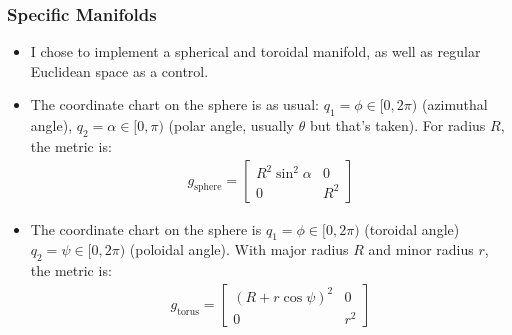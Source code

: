 \documentclass{beamer}
\begin{document}
\begin{frame}
    \frametitle{Specific Manifolds}

    \begin{itemize}
        \item I chose to implement a spherical and toroidal manifold,
        as well as regular Euclidean space as a control.
        \item The coordinate chart on the sphere is as usual: 
        $q_1 = \phi \in [0, 2\pi)$ (azimuthal angle),
        $q_2 = \alpha \in [0, \pi)$ (polar angle, usually $\theta$ but that's taken).
        For radius $R$, the metric is:
        \begin{align*}
            g_\text{sphere} = \begin{bmatrix}
                R^2\sin^2\alpha & 0 \\
                0 & R^2
            \end{bmatrix}
        \end{align*}
        \item The coordinate chart on the sphere is $q_1 = \phi \in [0,2\pi)$
        (toroidal angle) $q_2 = \psi \in [0,2\pi)$ (poloidal angle).
        With major radius $R$ and minor radius $r$, the metric is:
        \begin{align*}
            g_\text{torus} = \begin{bmatrix}
                (R + r\cos\psi)^2 & 0 \\
                0 & r^2
            \end{bmatrix}
        \end{align*}
    \end{itemize}
\end{frame}
\end{document}
